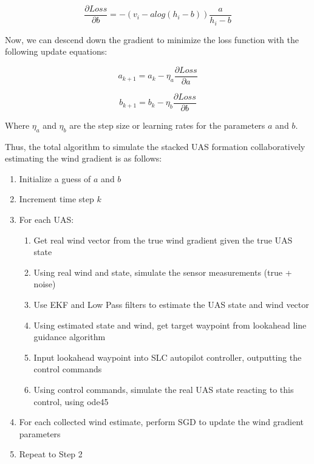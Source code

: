 \begin{equation}
    \frac{\partial Loss}{\partial b} = - (v_{i} - a log(h_{i} - b)) \frac{a}{h_{i} - b}
\end{equation}

Now, we can descend down the gradient to minimize the loss function with the following update equations:

\begin{equation}
    a_{k+1} = a_{k} - \eta_{a} \frac{\partial Loss}{\partial a}
\end{equation}

\begin{equation}
    b_{k+1} = b_{k} - \eta_{b} \frac{\partial Loss}{\partial b}
\end{equation}

Where $\eta_{a}$ and $\eta_{b}$ are the step size or learning rates for the parameters $a$ and $b$.

Thus, the total algorithm to simulate the stacked UAS formation collaboratively estimating the wind gradient is as follows:

\begin{enumerate}
    \item Initialize a guess of $a$ and $b$
    \item Increment time step $k$
    \item For each UAS:
        \begin{enumerate}
            \item Get real wind vector from the true wind gradient given the true UAS state
            \item Using real wind and state, simulate the sensor measurements (true + noise)
            \item Use EKF and Low Pass filters to estimate the UAS state and wind vector
            \item Using estimated state and wind, get target waypoint from lookahead line guidance algorithm
            \item Input lookahead waypoint into SLC autopilot controller, outputting the control commands
            \item Using control commands, simulate the real UAS state reacting to this control, using ode45
        \end{enumerate}
    \item For each collected wind estimate, perform SGD to update the wind gradient parameters
    \item Repeat to Step 2
\end{enumerate}

